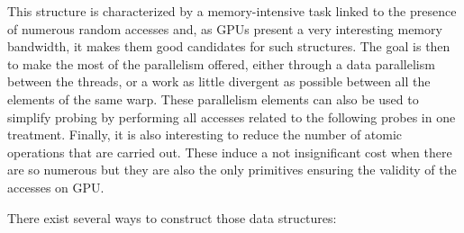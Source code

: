 This structure is characterized by a memory-intensive task linked to the presence of numerous random accesses and, as GPUs present a very interesting memory bandwidth, it makes them good candidates for such structures. The goal is then to make the most of the parallelism offered, either through a data parallelism between the threads, or a work as little divergent as possible between all the elements of the same warp. These parallelism elements can also be used to simplify probing by performing all accesses related to the following probes in one treatment. Finally, it is also interesting to reduce the number of atomic operations that are carried out. These induce a not insignificant cost when there are so numerous but they are also the only primitives ensuring the validity of the accesses on GPU.

There exist several ways to construct those data structures:

